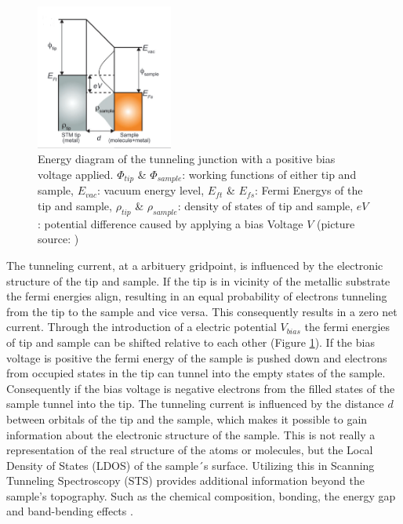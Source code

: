 \newpage
\begin{figure}
    \centering
    \includegraphics[width=0.4\textwidth]{graphics/Tunneling_diagram_japan.PNG}
    \caption{Energy diagram of the tunneling junction with a positive bias voltage applied. $\Phi_{tip}$ \& $\Phi_{sample}$: working functions of either tip and sample, $E_{vac}$: vacuum energy level,  $E_{ft}$ \& $E_{fs}$: Fermi Energys of the tip and sample,  $\rho_{tip}$ \& $\rho_{sample}$: density of states of tip and sample,  $eV$: potential difference caused by applying a bias Voltage $V$ (picture source: \cite{Kano}) }
    \label{fig:energy_diagram}
\end{figure}

The tunneling current, at a arbituery gridpoint, is influenced by the electronic structure of the tip and sample.
If the tip is in vicinity of the metallic substrate the fermi energies align, resulting in an equal probability of electrons tunneling from the tip to the sample and vice versa.
This consequently results in a zero net current. 
Through the introduction of a electric potential $V_{bias}$ the fermi energies of tip and sample can be shifted relative to each other (Figure \ref{fig:energy_diagram}).
If the bias voltage is positive the fermi energy of the sample is pushed down and electrons from occupied states in the tip can tunnel into the empty states of the sample.
Consequently if the bias voltage is negative electrons from the filled states of the sample tunnel into the tip.
The tunneling current is influenced by the distance $d$ between orbitals of the tip and the sample, which makes it possible to gain information about the electronic structure of the sample.
This is not really a representation of the real structure of the atoms or molecules, but the Local Density of States (LDOS) of the sample´s surface.
Utilizing this in Scanning Tunneling Spectroscopy (STS) provides additional information beyond the sample's topography.
Such as the chemical composition, bonding, the energy gap and band-bending effects \cite{cbai}.
\newpage
